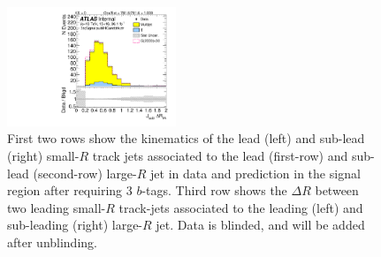 \begin{figure}[htbp!]
\begin{center}
\includegraphics[angle=270, width=0.45\textwidth]{./figures/boosted/Signal/b77_ThreeTag_Signal_sublHCand_trk_dr_blind.pdf}
  \caption{First two rows show the kinematics of the lead (left) and sub-lead (right) small-$R$ track jets associated to the lead (first-row) and sub-lead (second-row) large-$R$ jet in data and prediction in the signal region after requiring 3 $b$-tags. Third row shows the $\Delta R$ between two leading small-$R$ track-jets associated to the leading (left) and sub-leading (right) large-$R$ jet. Data is blinded, and will be added after unblinding. }
  \label{fig:boosted-3b-signal-blind-ak2}
\end{center}
\end{figure}


